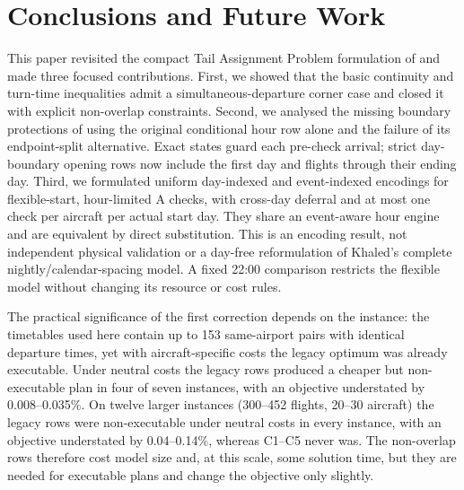 \section{Conclusions and Future Work}
\label{sec:conclusion}

This paper revisited the compact Tail Assignment Problem formulation of
\citet{khaled2018compact} and made three focused contributions. First, we
showed that the basic continuity and turn-time inequalities admit a
simultaneous-departure corner case and closed it with explicit non-overlap
constraints. Second, we analysed the missing boundary protections of using
the original conditional hour row alone and the failure of its endpoint-split
alternative. Exact states guard each pre-check arrival; strict day-boundary
opening rows now include the first day and flights through their ending day.
Third, we formulated uniform day-indexed and event-indexed encodings for
flexible-start, hour-limited A checks, with cross-day deferral and at most one
check per aircraft per actual start day. They share an event-aware hour
engine and are equivalent by direct substitution. This is an encoding result,
not independent physical validation or a day-free reformulation of Khaled's
complete nightly/calendar-spacing model. A fixed 22:00 comparison restricts
the flexible model without changing its resource or cost rules.

The practical significance of the first correction depends on the instance:
the timetables used here contain up to 153 same-airport pairs with identical
departure times, yet with aircraft-specific costs the legacy optimum was
already executable. Under neutral costs the legacy rows produced a cheaper but
non-executable plan in four of seven instances, with an objective understated
by 0.008--0.035\%. On twelve larger instances (300--452 flights, 20--30
aircraft) the legacy rows were non-executable under neutral costs in every
instance, with an objective understated by 0.04--0.14\%, whereas C1--C5 never
was. The non-overlap rows therefore cost model size and, at this scale, some
solution time, but they are needed for executable plans and change the
objective only slightly.

